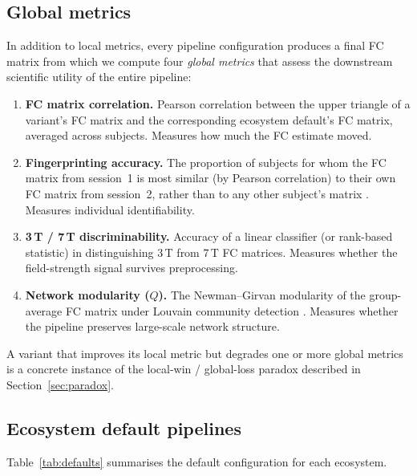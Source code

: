 \documentclass[11pt,a4paper]{article}
\begin{document}
\subsection{Global metrics}
\label{sec:global_metrics}

In addition to local metrics, every pipeline configuration produces a final FC matrix from which we compute four \emph{global metrics} that assess the downstream scientific utility of the entire pipeline:

\begin{enumerate}[label=(\roman*)]
    \item \textbf{FC matrix correlation.}  Pearson correlation between the upper triangle of a variant's FC matrix and the corresponding ecosystem default's FC matrix, averaged across subjects.  Measures how much the FC estimate moved.
    \item \textbf{Fingerprinting accuracy.}  The proportion of subjects for whom the FC matrix from session~1 is most similar (by Pearson correlation) to their own FC matrix from session~2, rather than to any other subject's matrix \citep{finn2015}.  Measures individual identifiability.
    \item \textbf{3\,T / 7\,T discriminability.}  Accuracy of a linear classifier (or rank-based statistic) in distinguishing 3\,T from 7\,T FC matrices.  Measures whether the field-strength signal survives preprocessing.
    \item \textbf{Network modularity ($Q$).}  The Newman--Girvan modularity of the group-average FC matrix under Louvain community detection \citep{rubinov2010}.  Measures whether the pipeline preserves large-scale network structure.
\end{enumerate}

A variant that improves its local metric but degrades one or more global metrics is a concrete instance of the local-win / global-loss paradox described in Section~\ref{sec:paradox}.


\subsection{Ecosystem default pipelines}

Table~\ref{tab:defaults} summarises the default configuration for each ecosystem.
\end{document}

